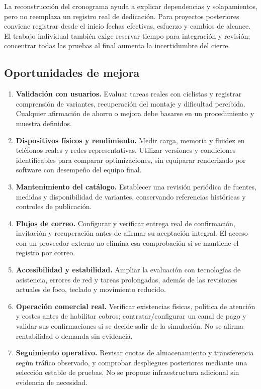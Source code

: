 \documentclass[12pt,letterpaper]{article}
\begin{document}
La reconstrucción del cronograma ayuda a explicar dependencias y solapamientos, pero no reemplaza un registro real de dedicación. Para proyectos posteriores conviene registrar desde el inicio fechas efectivas, esfuerzo y cambios de alcance. El trabajo individual también exige reservar tiempo para integración y revisión; concentrar todas las pruebas al final aumenta la incertidumbre del cierre.

\subsection{Oportunidades de mejora}
\begin{enumerate}
\item \textbf{Validación con usuarios.} Evaluar tareas reales con ciclistas y registrar comprensión de variantes, recuperación del montaje y dificultad percibida. Cualquier afirmación de ahorro o mejora debe basarse en un procedimiento y muestra definidos.
\item \textbf{Dispositivos físicos y rendimiento.} Medir carga, memoria y fluidez en teléfonos reales y redes representativas. Utilizar versiones y condiciones identificables para comparar optimizaciones, sin equiparar renderizado por software con desempeño del equipo final.
\item \textbf{Mantenimiento del catálogo.} Establecer una revisión periódica de fuentes, medidas y disponibilidad de variantes, conservando referencias históricas y controles de publicación.
\item \textbf{Flujos de correo.} Configurar y verificar entrega real de confirmación, invitación y recuperación antes de afirmar su aceptación integral. El acceso con un proveedor externo no elimina esa comprobación si se mantiene el registro por correo.
\item \textbf{Accesibilidad y estabilidad.} Ampliar la evaluación con tecnologías de asistencia, errores de red y tareas prolongadas, además de las revisiones actuales de foco, teclado y movimiento reducido.
\item \textbf{Operación comercial real.} Verificar existencias físicas, política de atención y costes antes de habilitar cobros; contratar/configurar un canal de pago y validar sus confirmaciones si se decide salir de la simulación. No se afirma rentabilidad o demanda sin evidencia.
\item \textbf{Seguimiento operativo.} Revisar cuotas de almacenamiento y transferencia según tráfico observado, y comprobar despliegues posteriores mediante una selección estable de pruebas. No se propone infraestructura adicional sin evidencia de necesidad.
\end{enumerate}
\end{document}
